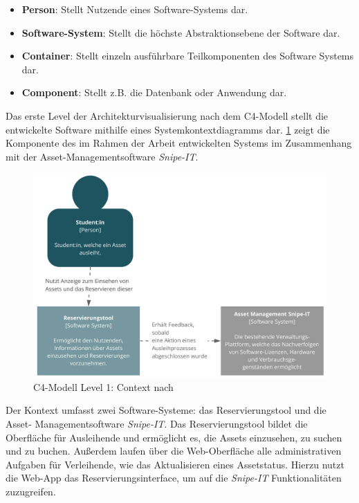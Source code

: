 \begin{itemize}
    \item \textbf{Person}: Stellt Nutzende eines Software-Systems dar.
    \item \textbf{Software-System}: Stellt die höchste Abstraktionsebene der
          Software dar.
    \item \textbf{Container}: Stellt einzeln ausführbare Teilkomponenten des
          Software Systems dar.
    \item \textbf{Component}: Stellt z.B. die Datenbank oder Anwendung dar.
\end{itemize}

{\sffamily\color{maincolor}{Level 1: Context}}

Das erste Level der Architekturvisualisierung nach dem C4-Modell stellt die
entwickelte Software mithilfe eines Systemkontextdiagramms dar. \ref{fig:level1}
zeigt die Komponente des im Rahmen der Arbeit entwickelten Systems im
Zusammenhang mit der Asset-Managementsoftware \textit{Snipe-IT}.

\begin{figure}[h]
    \centering
    \includegraphics[scale=0.4]{Bilder/C4_1.pdf}
    \caption[C4-Modell Level 1: Context]{C4-Modell Level 1: Context nach
        }
    \label{fig:level1}
\end{figure}

Der Kontext umfasst zwei Software-Systeme: das Reservierungstool und die Asset- Managementsoftware
\textit{Snipe-IT}. Das Reservierungstool bildet die Oberfläche für Ausleihende und ermöglicht es, die Assets
einzusehen, zu suchen und zu buchen. Außerdem laufen über die Web-Oberfläche alle administrativen
Aufgaben für Verleihende, wie das Aktualisieren eines Assetstatus. Hierzu nutzt die Web-App das
Reservierungsinterface, um auf die \textit{Snipe-IT} Funktionalitäten zuzugreifen.

